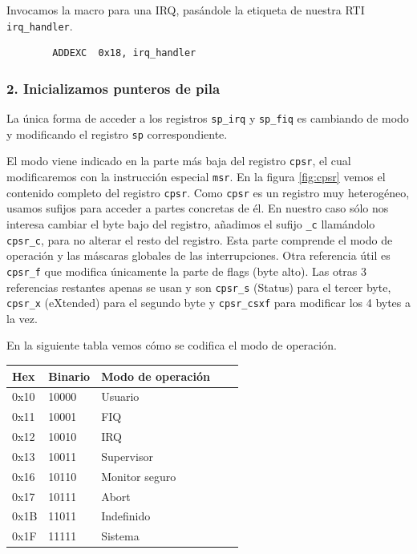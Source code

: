   Invocamos la macro para una IRQ, pasándole la etiqueta de nuestra RTI {\tt irq\_handler}.
\begin{lstlisting}
        ADDEXC  0x18, irq_handler
\end{lstlisting}

\subsubsection{2. Inicializamos punteros de pila}

La única forma de acceder a los registros {\tt sp\_irq} y {\tt sp\_fiq} es cambiando de modo
 y modificando el registro {\tt sp} correspondiente.

El modo viene indicado en la parte más baja del registro {\tt cpsr}, el cual modificaremos
con la instrucción especial {\tt msr}. En la figura \ref{fig:cpsr} vemos el contenido completo
del registro {\tt cpsr}. Como {\tt cpsr} es un registro muy heterogéneo, usamos
sufijos para acceder a partes concretas de él. En nuestro caso sólo nos
interesa cambiar el byte bajo del registro, añadimos el sufijo {\tt \_c} llamándolo {\tt cpsr\_c},
para no alterar el resto del registro. Esta parte comprende el modo de operación
y las máscaras globales de las interrupciones. Otra referencia útil es {\tt cpsr\_f} que modifica
únicamente la parte de flags (byte alto). Las otras 3 referencias restantes apenas se usan y
son {\tt cpsr\_s} (Status) para el tercer byte, {\tt cpsr\_x} (eXtended) para el segundo byte y
{\tt cpsr\_csxf} para modificar los 4 bytes a la vez.

En la siguiente tabla vemos cómo se codifica el modo de operación.

\begin{longtable}{ p{1.8cm} | p{2cm} | p{5cm} | p{1cm} | p{1cm} }
\hline
{\bf Hex} & {\bf Binario} & {\bf Modo de operación} \\ \hline
0x10 & 10000 & Usuario        \\ \hline
0x11 & 10001 & FIQ            \\ \hline
0x12 & 10010 & IRQ            \\ \hline
0x13 & 10011 & Supervisor     \\ \hline
0x16 & 10110 & Monitor seguro \\ \hline
0x17 & 10111 & Abort          \\ \hline
0x1B & 11011 & Indefinido     \\ \hline
0x1F & 11111 & Sistema        \\ \hline
\end{longtable}

